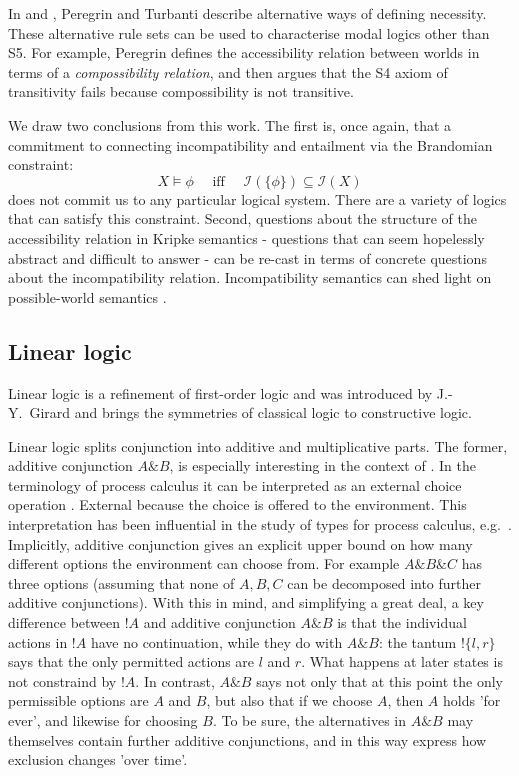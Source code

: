 In \cite{PeregrinJ:logbasoi} and \cite{turbanti}, Peregrin and Turbanti describe alternative ways of defining necessity.
These alternative rule sets can be used to characterise modal logics other than S5.
For example, Peregrin defines the accessibility relation between worlds in terms of a \emph{compossibility relation}, and then argues that the S4 axiom of transitivity fails because compossibility is not transitive.

We draw two conclusions from this work.
The first is, once again, that a commitment to connecting incompatibility and entailment via the Brandomian constraint:
\[
X \models \phi\quad \text{ iff }\quad \mathcal{I}(\{\phi\}) \subseteq \mathcal{I}(X)
\]
does not commit us to any particular logical system. 
There are a variety of logics that can satisfy this constraint.
Second, questions about the structure of the accessibility relation in Kripke semantics - questions that can seem hopelessly abstract and difficult to answer - can be re-cast in terms of concrete questions about the incompatibility relation.
Incompatibility semantics can shed light on possible-world semantics \cite{turbanti}. 

\subsection{Linear logic}

Linear logic \cite{GirardJY:linlog} is a refinement of
first-order logic and was introduced by J.-Y.~Girard and
brings the symmetries of classical logic to constructive
logic. 

Linear logic splits conjunction into additive and multiplicative
parts. The former, additive conjunction $A \& B$, is especially
interesting in the context of \cathoristic{}. In the terminology of
process calculus it can be interpreted as an external choice operation
\cite{AbramskyS:comintoll}. External because the choice is offered to
the environment.  This interpretation has been influential in the
study of types for process calculus,
e.g.~\cite{HondaK:unitypsfsifLONG,TakeuchiK:intbaslaits,HondaK:lanpriatdfscbp}.
Implicitly, additive conjunction gives an explicit upper bound on how
many different options the environment can choose from. For example 
$A \& B \& C$ has  three options (assuming that none of $A, B, C$
can be decomposed into further additive conjunctions).  With this in
mind, and simplifying a great deal, a key difference between $!A$ and
additive conjunction $A \& B$ is that the individual actions in $!A$
have no continuation, while they do with $A \& B$: the tantum $!\{l, r\}$ says
that the only permitted  actions are $l$ and $r$. What
happens at later states is not constraind by $!A$.  In contrast, $A \&
B$ says not only that at this point the only permissible options are $A$
and $B$, but also that if we choose $A$, then $A$ holds 'for ever',
and likewise for choosing $B$. To be sure, the alternatives in $A \&
B$ may themselves contain further additive conjunctions, and in this
way express how exclusion changes 'over time'.


